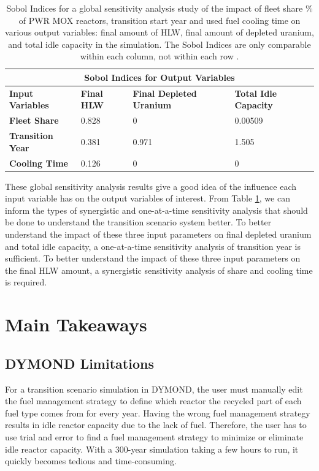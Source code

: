     \begin{table}[]
        \centering
        \doublespacing
        \caption{Sobol Indices for a global sensitivity analysis study of the impact of 
        fleet share \% of PWR MOX reactors, transition start year and used fuel cooling time on various output
        variables: final amount of HLW, final amount of depleted uranium, and total 
        idle capacity in the simulation. The Sobol Indices are only comparable within each column, 
        not within each row \cite{chee_arfc/dcwrapper_2019}.}
        \label{tab:sobol}
            \small
            \begin{tabular}{l|lll}
                \hline	
                \multicolumn{4}{c}{\textbf{Sobol Indices for Output Variables}}   \\ \hline
                \textbf{Input Variables} & \textbf{Final HLW} & \textbf{Final Depleted Uranium} & \textbf{Total Idle Capacity} \\ \hline
                \textbf{Fleet Share} & 0.828     & 0                      & 0.00509             \\
                \textbf{Transition Year}                & 0.381     & 0.971                  & 1.505               \\
                \textbf{Cooling Time}                         & 0.126     & 0                      & 0                   \\ \hline

            \end{tabular}
    \end{table}

These global sensitivity analysis results give a good idea of the influence each 
input variable has on the output variables of interest. 
From Table \ref{tab:sobol}, we can inform the types of synergistic and one-at-a-time 
sensitivity analysis that should be done 
to understand the transition scenario system better. 
To better understand the impact of these three input parameters on final depleted 
uranium and total idle capacity, a one-at-a-time sensitivity analysis of transition 
year is sufficient. 
To better understand the impact of these three input parameters on the final HLW 
amount, a synergistic sensitivity analysis of share and cooling time is required.

\section{Main Takeaways}
\subsection{DYMOND Limitations}
For a transition scenario simulation in DYMOND, the user must 
manually edit the fuel management 
strategy to define which reactor the recycled 
part of each fuel type comes from for every year. 
Having the wrong fuel management strategy results in idle reactor
capacity due to the lack of fuel. 
Therefore, the user has to use trial and error to find a fuel 
management strategy to minimize or eliminate idle reactor capacity. 
With a 300-year simulation taking a few hours to run, it quickly 
becomes tedious and time-consuming.  

